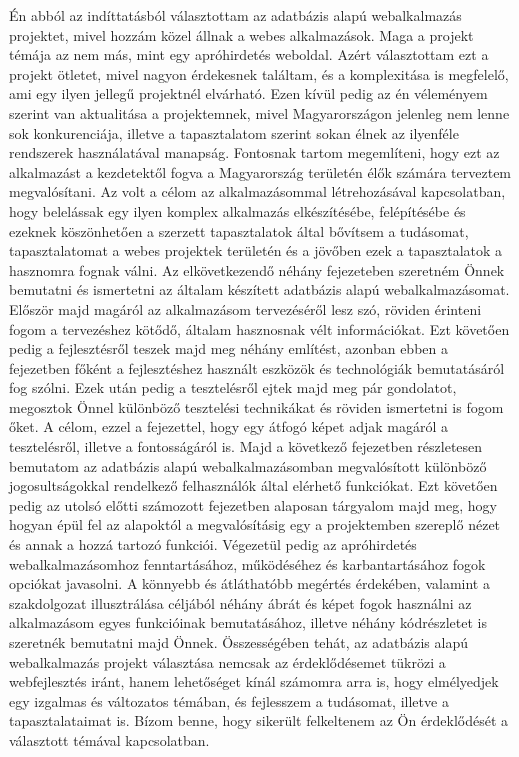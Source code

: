 \documentclass[]{thesis-ekf}
\theoremstyle{definition}
\theoremstyle{remark}
\begin{document}
	Én abból az indíttatásból választottam az adatbázis alapú webalkalmazás projektet, mivel hozzám közel állnak a webes alkalmazások. Maga a projekt témája az nem más, mint egy apróhirdetés weboldal. Azért választottam ezt a projekt ötletet, mivel nagyon érdekesnek találtam, és a komplexitása is megfelelő, ami egy ilyen jellegű projektnél elvárható. Ezen kívül pedig az én véleményem szerint van aktualitása a projektemnek, mivel Magyarországon jelenleg nem lenne sok konkurenciája, illetve a tapasztalatom szerint sokan élnek az ilyenféle rendszerek használatával manapság. Fontosnak tartom megemlíteni, hogy ezt az alkalmazást a kezdetektől fogva a Magyarország területén élők számára terveztem megvalósítani. Az volt a célom az alkalmazásommal létrehozásával kapcsolatban, hogy belelássak egy ilyen komplex alkalmazás elkészítésébe, felépítésébe és ezeknek köszönhetően a szerzett tapasztalatok által bővítsem a tudásomat, tapasztalatomat a webes projektek területén és a jövőben ezek a tapasztalatok a hasznomra fognak válni. Az elkövetkezendő néhány fejezeteben szeretném Önnek bemutatni és ismertetni az általam készített adatbázis alapú webalkalmazásomat. Először majd magáról az alkalmazásom tervezéséről lesz szó, röviden érinteni fogom a tervezéshez kötődő, általam hasznosnak vélt információkat. Ezt követően pedig a fejlesztésről teszek majd meg néhány említést, azonban ebben a fejezetben főként a fejlesztéshez használt eszközök és technológiák bemutatásáról fog szólni. Ezek után pedig a tesztelésről ejtek majd meg pár gondolatot, megosztok Önnel különböző tesztelési technikákat és röviden ismertetni is fogom őket. A célom, ezzel a fejezettel, hogy egy átfogó képet adjak magáról a tesztelésről, illetve a fontosságáról is. Majd a következő fejezetben részletesen bemutatom az adatbázis alapú webalkalmazásomban megvalósított különböző jogosultságokkal rendelkező felhasználók által elérhető funkciókat. Ezt követően pedig az utolsó előtti számozott fejezetben alaposan tárgyalom majd meg, hogy hogyan épül fel az alapoktól a megvalósításig egy a projektemben szereplő nézet és annak a hozzá tartozó funkciói. Végezetül pedig az apróhirdetés webalkalmazásomhoz fenntartásához, működéséhez és karbantartásához fogok opciókat javasolni. A könnyebb és átláthatóbb megértés érdekében, valamint a szakdolgozat illusztrálása céljából néhány ábrát és képet fogok használni az alkalmazásom egyes funkcióinak bemutatásához, illetve néhány kódrészletet is szeretnék bemutatni majd Önnek. Összességében tehát, az adatbázis alapú webalkalmazás projekt választása nemcsak az érdeklődésemet tükrözi a webfejlesztés iránt, hanem lehetőséget kínál számomra arra is, hogy elmélyedjek egy izgalmas és változatos témában, és fejlesszem a tudásomat, illetve a tapasztalataimat is. Bízom benne, hogy sikerült felkeltenem az Ön érdeklődését a választott témával kapcsolatban. 
	
\end{document}
